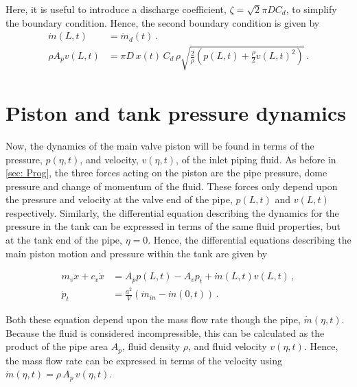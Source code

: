 Here, it is useful to introduce a discharge coefficient, $\zeta = \sqrt{2} \pi D C_d$, to simplify the boundary condition. Hence, the second boundary condition is given by
~
\begin{equation} \label{eq: QWMBoundary2}
\begin{split}
    \dot{m}(L,t) &= \dot{m}_d(t) \, . \\
    \rho A_p v(L,t) &= \pi D \, x(t) \, C_d \, \rho \sqrt{\frac{2}{\rho} \left( p(L,t) + \frac{\rho}{2} v(L,t)^2 \right)} \, .
\end{split}
\end{equation}

\section{Piston and tank pressure dynamics}

Now, the dynamics of the main valve piston will be found in terms of the pressure, $p(\eta,t)$, and velocity, $v(\eta,t)$, of the inlet piping fluid. As before in \cref{sec: Prog}, the three forces acting on the piston are the pipe pressure, dome pressure and change of momentum of the fluid. These forces only depend upon the pressure and velocity at the valve end of the pipe, $p(L,t)$ and $v(L,t)$ respectively. Similarly, the differential equation describing the dynamics for the pressure in the tank can be expressed in terms of the same fluid properties, but at the tank end of the pipe, $\eta = 0$. Hence, the differential equations describing the main piston motion and pressure within the tank are given by

\begin{equation} \label{eq: ValveODEsPipe}
\begin{split}
    m_v \ddot{x} + c_v \dot{x} &= A_p p(L,t) - A_v p_t + \dot{m}(L,t)
    v(L,t) %
    \, , \\
    \dot{p}_t &= \frac{a^2}{V} \left( \dot{m}_{in} - \dot{m}(0,t) \right) \, .
\end{split}
\end{equation}

Both these equation depend upon the mass flow rate though the pipe, $\dot{m}(\eta,t)$. Because the fluid is considered incompressible, this can be calculated as the product of the pipe area $A_p$, fluid density $\rho$, and fluid velocity $v(\eta,t)$. Hence, the mass flow rate can be expressed in terms of the velocity using $\dot{m}(\eta,t) = \rho \, A_p \, v(\eta,t)$.

